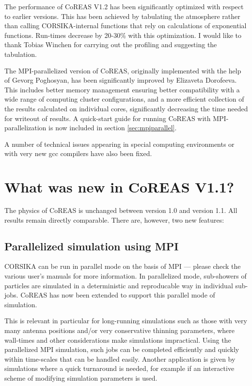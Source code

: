 \documentclass[a4paper,10pt]{article}
\begin{document}
The performance of CoREAS V1.2 has been significantly optimized with respect to earlier versions. This has been achieved by tabulating the atmosphere rather than calling CORSIKA-internal functions that rely on calculations of exponential functions. Run-times decrease by 20-30\% with this optimization. I would like to thank Tobias Winchen for carrying out the profiling and suggesting the tabulation.

The MPI-parallelized version of CoREAS, originally implemented with the help of Gevorg Poghosyan, has been significantly improved by Elizaveta Dorofeeva. This includes better memory management ensuring better compatibility with a wide range of computing cluster configurations, and a more efficient collection of the results calculated on individual cores, significantly decreasing the time needed for writeout of results. A quick-start guide for running CoREAS with MPI-parallelization is now included in section \ref{sec:mpiparallel}.

A number of technical issues appearing in special computing environments or with very new gcc compilers have also been fixed.

\section{What was new in CoREAS V1.1?}

The physics of CoREAS is unchanged between version 1.0 and version 1.1. All results remain directly comparable. There are, however, two new features:

\subsection{Parallelized simulation using MPI}

CORSIKA can be run in parallel mode on the basis of MPI --- please check the various user's manuals for more information. In parallelized mode, sub-showers of particles are simulated in a deterministic and reproducable way in individual sub-jobs. CoREAS has now been extended to support this parallel mode of simulation.

This is relevant in particular for long-running simulations such as those with very many antenna positions and/or very conservative thinning parameters, where wall-times and other considerations make simulations impractical. Using the parallelized MPI simulation, such jobs can be completed efficiently and quickly within time-scales that can be handled easily. Another application is given by simulations where a quick turnaround is needed, for example if an interactive scheme of modifying simulation parameters is used.
\end{document}
